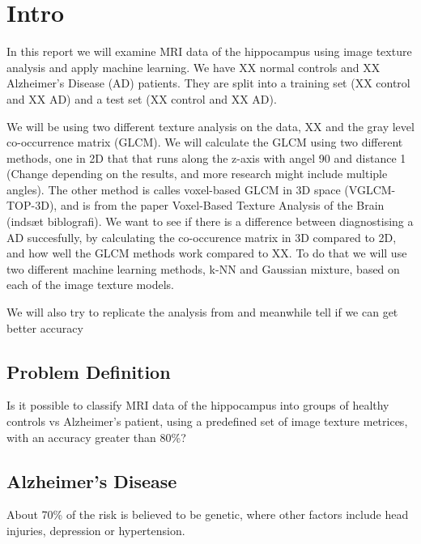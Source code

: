 \chapter{Intro}

In this report we will examine MRI data of the hippocampus using image texture analysis and apply machine learning. We have XX normal controls and XX Alzheimer's Disease (AD) patients. They are split into a training set (XX control and XX AD) and a test set (XX control and XX AD).

We will be using two different texture analysis on the data, XX and the gray level co-occ\-urren\-ce matrix (GLCM).
We will calculate the GLCM using two different methods, one in 2D that that runs along the z-axis with angel 90 and distance 1 (Change depending on the results, and more research might include multiple angles).\cite{Castellano}
The other method is calles voxel-based GLCM in 3D space (VGLCM-TOP-3D), and is from the paper Voxel-Based Texture Analysis of the Brain (indsæt biblografi).
We want to see if there is a difference between diagnostising a AD succesfully, by calculating the co-occurence matrix in 3D compared to 2D, and how well the GLCM methods work
compared to XX. To do that we will use two different machine learning methods, k-NN and Gaussian mixture, based on each of the image texture models.

We will also try to replicate the analysis from \cite{MRfreeborough} and meanwhile tell if we can get better accuracy


\section{Problem Definition}

Is it possible to classify MRI data of the hippocampus into groups of healthy controls vs Alzheimer's patient, using a predefined set of image texture metrices, with an accuracy great\-er than 80\%?

\section{Alzheimer's Disease}

About 70\% of the risk is believed to be genetic, where other factors include head injuries, depression or hypertension. \cite{Magnetic}

